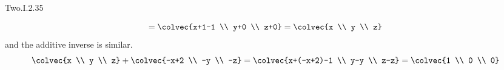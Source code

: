 \begin{ans}{Two.I.2.35}
\begin{exparts}
\begin{equation*}
             =\colvec{x+1-1 \\ y+0 \\ z+0}
             =\colvec{x \\ y \\ z}
           \end{equation*}
           and the additive inverse is similar.
           \begin{equation*}
             \colvec{x \\ y \\ z}+\colvec{-x+2 \\ -y \\ -z}
             =\colvec{x+(-x+2)-1 \\ y-y \\ z-z}
             =\colvec{1 \\ 0 \\ 0}
           \end{equation*}


\end{exparts}
\end{ans}
